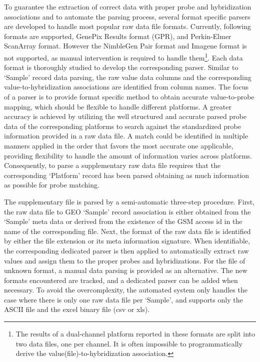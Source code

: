 To guarantee the extraction of correct data with proper probe and
hybridization associations and to automate the parsing process, several format
specific parsers are developed to handle most popular raw data file formats.
%
Currently, following formats are supported, GenePix Results format (GPR),
and Perkin-Elmer ScanArray format.  
However the NimbleGen Pair format and Imagene format is not supported, as
manual intervention is required to handle them\footnote{The results of a
  dual-channel platform reported in these formats are split into two data
  files, one per channel.  It is often impossible to programmatically derive
  the value(file)-to-hybridization association.}.
%
Each data format is thoroughly studied to develop the corresponding parser.
%
Similar to `Sample' record data parsing, the raw value data columns and the
corresponding value-to-hybridization associations are identified from column
names.
%
The focus of a parser is to provide format specific method to obtain accurate
value-to-probe mapping, which should be flexible to handle different platforms.
%
A greater accuracy is achieved by utilizing the well structured and accurate
parsed probe data of the corresponding platforms to search against the
standardized probe information provided in a raw data file.
%
A match could be identified in multiple manners applied in the order that
favors the most accurate one applicable, providing flexibility to handle the
amount of information varies across platforms.
%
Consequently, to parse a supplementary raw data file requires that the
corresponding `Platform' record has been parsed obtaining as much information
as possible for probe matching.


The supplementary file is parsed by a semi-automatic three-step procedure.
%
First, the raw data file to GEO `Sample' record association is either obtained
from the `Sample' meta data or derived from the existence of the GSM access id
in the name of the corresponding file.
%
Next, the format of the raw data file is identified by either the file
extension or its meta information signature.
%
When identifiable, the corresponding dedicated parser is then applied to
automatically extract raw values and assign them to the proper probes and
hybridizations.
%
For the file of unknown format, a manual data parsing is provided as an
alternative.
%
The new formats encountered are tracked, and a dedicated parser can be added
when necessary.
%
%
To avoid the overcomplexity, the automated system only handles the case
where there is only one raw data file per `Sample', and supports only the
ASCII file and the excel binary file (csv or xls).

